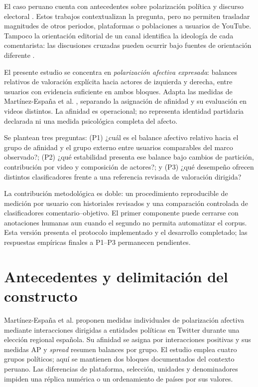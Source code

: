 \documentclass[conference,letterpaper]{IEEEtran}
\begin{document}
El caso peruano cuenta con antecedentes sobre polarización política y discurso electoral \cite{Ponte2022,Mejia2024}. Estos trabajos contextualizan la pregunta, pero no permiten trasladar magnitudes de otros periodos, plataformas o poblaciones a usuarios de YouTube. Tampoco la orientación editorial de un canal identifica la ideología de cada comentarista: las discusiones cruzadas pueden ocurrir bajo fuentes de orientación diferente \cite{Chae2024,Wu2021}.

El presente estudio se concentra en \emph{polarización afectiva expresada}: balances relativos de valoración explícita hacia actores de izquierda y derecha, entre usuarios con evidencia suficiente en ambos bloques. Adapta las medidas de Martínez-España et al. \cite{polariz}, separando la asignación de afinidad y su evaluación en videos distintos. La afinidad es operacional; no representa identidad partidaria declarada ni una medida psicológica completa del afecto.

Se plantean tres preguntas: (P1) ¿cuál es el balance afectivo relativo hacia el grupo de afinidad y el grupo externo entre usuarios comparables del marco observado?; (P2) ¿qué estabilidad presenta ese balance bajo cambios de partición, contribución por video y composición de actores?; y (P3) ¿qué desempeño ofrecen distintos clasificadores frente a una referencia revisada de valoración dirigida?

La contribución metodológica es doble: un procedimiento reproducible de medición por usuario con historiales revisados y una comparación controlada de clasificadores comentario--objetivo. El primer componente puede cerrarse con anotaciones humanas aun cuando el segundo no permita automatizar el corpus. Esta versión presenta el protocolo implementado y el desarrollo completado; las respuestas empíricas finales a P1--P3 permanecen pendientes.

\section{Antecedentes y delimitación del constructo}
Martínez-España et al. \cite{polariz} proponen medidas individuales de polarización afectiva mediante interacciones dirigidas a entidades políticas en Twitter durante una elección regional española. Su afinidad se asigna por interacciones positivas y sus medidas AP y \emph{spread} resumen balances por grupo. El estudio emplea cuatro grupos políticos; aquí se mantienen dos bloques documentados del contexto peruano. Las diferencias de plataforma, selección, unidades y denominadores impiden una réplica numérica o un ordenamiento de países por sus valores.
\end{document}
